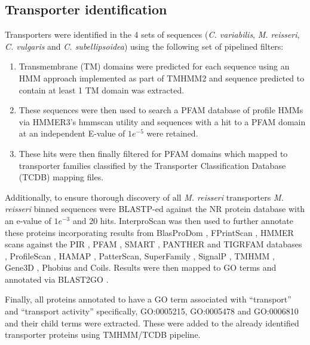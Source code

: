 \subsection{Transporter identification}

Transporters were identified in the 4 sets of sequences (\textit{C. variabilis}, \textit{M. reisseri},
\textit{C. vulgaris} and \textit{C. subellipsoidea}) using the following set of pipelined filters:
\begin{enumerate}
    \item Transmembrane (TM) domains were predicted for each sequence using an HMM approach implemented as part of TMHMM2 \citep{Sonnhammer1998,Krogh2001}
and sequence predicted to contain at least 1 TM domain was extracted.
    \item These sequences were then used to search a PFAM database of profile HMMs \citep{Eddy1998} via HMMER3's hmmscan utility \citep{Eddy1995,Johnson2010,Eddy2011,Mistry2013}
        and sequences with a hit to a PFAM domain at an independent E-value of \(1e^{-5}\) were retained.
    \item These hits were then finally filtered for PFAM domains which mapped to transporter families classified by the Transporter Classification Database (TCDB) \citep{Saier2006,Saier2008,Saier2009,Saier2014}
        mapping files.
\end{enumerate}

Additionally, to ensure thorough discovery of 
all \textit{M. reisseri} transporters \textit{M. reisseri} binned sequences 
were BLASTP-ed against the NR protein database with an e-value of \(1e^{-3}\) and 20 hits.
InterproScan \citep{Zdobnov2001a} was then used to 
further annotate these proteins incorporating
results from BlasProDom \citep{Servant2002}, FPrintScan \citep{Attwood1994}, 
HMMER \citep{Eddy2001} scans against the PIR \citep{Barker1998}, PFAM \citep{Bateman2002}, 
SMART \citep{Schultz1998}, PANTHER \citep{Thomas2003a} and TIGRFAM databases \citep{Haft2003}, 
ProfileScan \citep{Gribskov1988},
HAMAP \citep{Lima2009}, PatterScan, 
SuperFamily \citep{Gough2002}, 
SignalP \citep{Petersen2011}, TMHMM \citep{Sonnhammer1998}, 
Gene3D \citep{Buchan2002}, Phobius \citep{Kall2007}
and Coils. Results were then mapped to GO terms \citep{Ashburner2000,Harris2004}
and annotated via BLAST2GO \citep{Conesa2005a}.

Finally, all proteins annotated to have a GO term associated with ``transport'' and
``transport activity'' specifically, GO:0005215, GO:0005478 and GO:0006810 and their child
terms were extracted.  These were added to the already identified transporter
proteins using TMHMM/TCDB pipeline.

